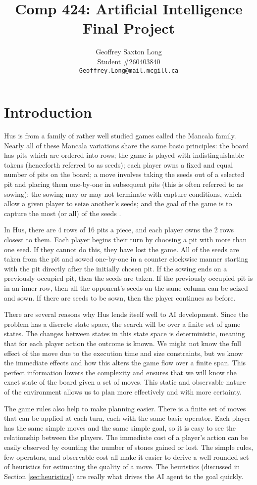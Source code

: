 \documentclass[]{article}
\title{Comp 424: Artificial Intelligence \\ Final Project}
\author{Geoffrey Saxton Long\\
Student \#260403840 \\
{\tt\small Geoffrey.Long@mail.mcgill.ca}
}
\begin{document}
\maketitle

\newpage
\section{Introduction}
Hus is from a family of rather well studied games called the Mancala family. Nearly all of these Mancala variations share the same basic principles: the board has pits which are ordered into rows; the game is played with indistinguishable tokens (henceforth referred to as seeds); each player owns a fixed and equal number of pits on the board; a move involves taking the seeds out of a selected pit and placing them one-by-one in subsequent pits (this is often referred to as sowing); the sowing may or may not terminate with capture conditions, which allow a given player to seize another's seeds; and the goal of the game is to capture the most (or all) of the seeds \cite{donkers2002programming}. 

In Hus, there are 4 rows of 16 pits a piece, and each player owns the 2 rows closest to them. Each player begins their turn by choosing a pit with more than one seed. If they cannot do this, they have lost the game. All of the seeds are taken from the pit and sowed one-by-one in a counter clockwise manner starting with the pit directly after the initially chosen pit. If the sowing ends on a previously occupied pit, then the seeds are taken. If the previously occupied pit is in an inner row, then all the opponent's seeds on the same column can be seized and sown. If there are seeds to be sown, then the player continues as before. 

There are several reasons why Hus lends itself well to AI development. Since the problem has a discrete state space, the search will be over a finite set of game states. The changes between states in this state space is deterministic, meaning that for each player action the outcome is known. We might not know the full effect of the move due to the execution time and size constraints, but we know the immediate effects and how this alters the game flow over a finite span. This perfect information lowers the complexity and ensures that we will know the exact state of the board given a set of moves. This static and observable nature of the environment allows us to plan more effectively and with more certainty. 

The game rules also help to make planning easier. There is a finite set of moves that can be applied at each turn, each with the same basic operator. Each player has the same simple moves and the same simple goal, so it is easy to see the relationship between the players. The immediate cost of a player's action can be easily observed by counting the number of stones gained or lost. The simple rules, few operators, and observable cost all make it easier to derive a well rounded set of heuristics for estimating the quality of a move. The heuristics (discussed in Section \ref{sec:heuristics}) are really what drives the AI agent to the goal quickly. 
\end{document}
